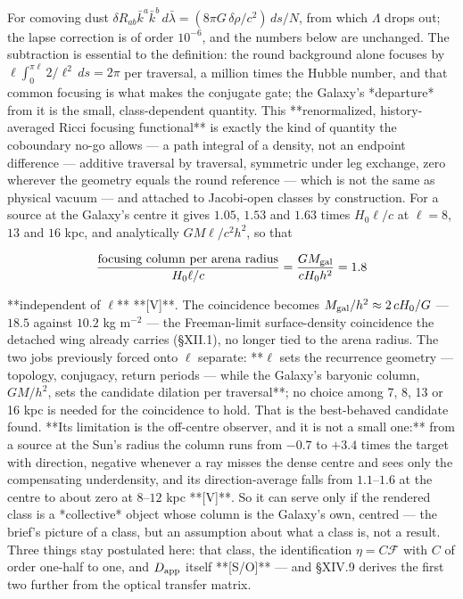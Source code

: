 For comoving dust $\delta R_{ab}\bar k^a\bar k^b\,d\bar\lambda = (8\pi G\,\delta\rho/c^2)\,ds/N$, from which $\Lambda$ drops out; the lapse correction is of order $10^{-6}$, and the numbers below are unchanged. The subtraction is essential to the definition: the round background alone focuses by $\ell\int_0^{\pi\ell}2/\ell^2\,ds = 2\pi$ per traversal, a million times the Hubble number, and that common focusing is what makes the conjugate gate; the Galaxy's *departure* from it is the small, class-dependent quantity. This **renormalized, history-averaged Ricci focusing functional** is exactly the kind of quantity the coboundary no-go allows — a path integral of a density, not an endpoint difference — additive traversal by traversal, symmetric under leg exchange, zero wherever the geometry equals the round reference — which is not the same as physical vacuum — and attached to Jacobi-open classes by construction. For a source at the Galaxy's centre it gives $1.05$, $1.53$ and $1.63$ times $H_0\ell/c$ at $\ell = 8$, $13$ and $16$ kpc, and analytically $GM\ell/c^2h^2$, so that

$$\frac{\text{focusing column per arena radius} }{H_0\ell/c} = \frac{GM_{\rm gal} }{cH_0h^2} = 1.8$$

**independent of $\ell$** **[V]**. The coincidence becomes $M_{\rm gal}/h^2\approx2\,cH_0/G$ — $18.5$ against $10.2$ kg m$^{-2}$ — the Freeman-limit surface-density coincidence the detached wing already carries (§XII.1), no longer tied to the arena radius. The two jobs previously forced onto $\ell$ separate: **$\ell$ sets the recurrence geometry — topology, conjugacy, return periods — while the Galaxy's baryonic column, $GM/h^2$, sets the candidate dilation per traversal**; no choice among 7, 8, 13 or 16 kpc is needed for the coincidence to hold. That is the best-behaved candidate found. **Its limitation is the off-centre observer, and it is not a small one:** from a source at the Sun's radius the column runs from $-0.7$ to $+3.4$ times the target with direction, negative whenever a ray misses the dense centre and sees only the compensating underdensity, and its direction-average falls from $1.1$–$1.6$ at the centre to about zero at $8$–$12$ kpc **[V]**. So it can serve only if the rendered class is a *collective* object whose column is the Galaxy's own, centred — the brief's picture of a class, but an assumption about what a class is, not a result. Three things stay postulated here: that class, the identification $\eta = C\mathcal F$ with $C$ of order one-half to one, and $D_{\rm app}$ itself **[S/O]** — and §XIV.9 derives the first two further from the optical transfer matrix.

